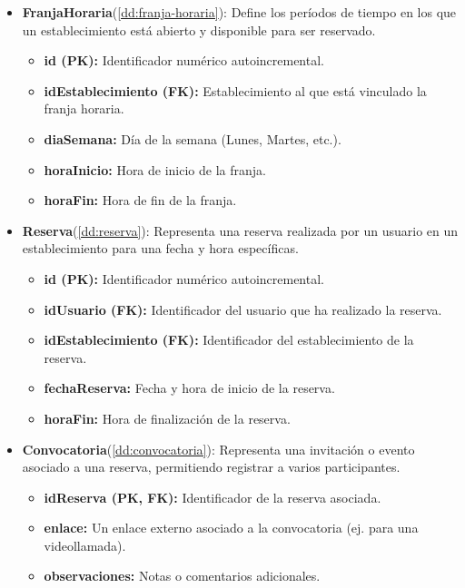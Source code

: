 \begin{itemize}
	\item \textbf{FranjaHoraria}(\ref{dd:franja-horaria}): Define los períodos de tiempo en los que un establecimiento está abierto y disponible para ser reservado.
	\begin{itemize}
       \item \textbf{id (PK):} Identificador numérico autoincremental.
       \item \textbf{idEstablecimiento (FK):} Establecimiento al que está vinculado la franja horaria.
       \item \textbf{diaSemana:} Día de la semana (Lunes, Martes, etc.).
       \item \textbf{horaInicio:} Hora de inicio de la franja.
       \item \textbf{horaFin:} Hora de fin de la franja.
	\end{itemize}
\end{itemize}

\begin{itemize}
	\item \textbf{Reserva}(\ref{dd:reserva}): Representa una reserva realizada por un usuario en un establecimiento para una fecha y hora específicas.
	\begin{itemize}
       \item \textbf{id (PK):} Identificador numérico autoincremental.
       \item \textbf{idUsuario (FK):} Identificador del usuario que ha realizado la reserva.
       \item \textbf{idEstablecimiento (FK):} Identificador del establecimiento de la reserva.
       \item \textbf{fechaReserva:} Fecha y hora de inicio de la reserva.
       \item \textbf{horaFin:} Hora de finalización de la reserva.
	\end{itemize}
\end{itemize}

\begin{itemize}
	\item \textbf{Convocatoria}(\ref{dd:convocatoria}): Representa una invitación o evento asociado a una reserva, permitiendo registrar a varios participantes.
	\begin{itemize}
       \item \textbf{idReserva (PK, FK):} Identificador de la reserva asociada.
       \item \textbf{enlace:} Un enlace externo asociado a la convocatoria (ej. para una videollamada).
       \item \textbf{observaciones:} Notas o comentarios adicionales.
	\end{itemize}
\end{itemize}

